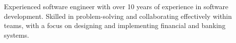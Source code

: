 

\begin{cvparagraph}

    Experienced software engineer with over 10 years of experience in software development.
    Skilled in problem-solving and collaborating effectively within teams, with a focus on designing and implementing financial and banking systems.
\end{cvparagraph}
